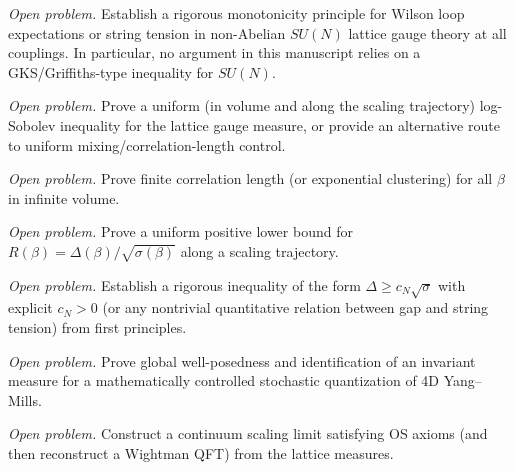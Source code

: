 \begin{theorem}
\label{thm:nonabelian_monotonicity_supp}
\emph{Open problem.} Establish a rigorous monotonicity principle for Wilson loop expectations or string tension in non-Abelian $SU(N)$ lattice gauge theory at all couplings.
In particular, no argument in this manuscript relies on a GKS/Griffiths-type inequality for $SU(N)$.
\end{theorem}

\begin{theorem}
\label{thm:uniform-lsi-induction}
\emph{Open problem.} Prove a uniform (in volume and along the scaling trajectory) log-Sobolev inequality for the lattice gauge measure, or provide an alternative route to uniform mixing/correlation-length control.
\end{theorem}

\begin{theorem}
\label{thm:cluster}
\emph{Open problem.} Prove finite correlation length (or exponential clustering) for all $\beta$ in infinite volume.
\end{theorem}

\begin{theorem}
\label{thm:ratio-bound}
\emph{Open problem.} Prove a uniform positive lower bound for $R(\beta)=\Delta(\beta)/\sqrt{\sigma(\beta)}$ along a scaling trajectory.
\end{theorem}

\begin{theorem}
\label{thm:giles-teper_supp}
\emph{Open problem.} Establish a rigorous inequality of the form $\Delta\ge c_N\sqrt{\sigma}$ with explicit $c_N>0$ (or any nontrivial quantitative relation between gap and string tension) from first principles.
\end{theorem}

\begin{theorem}
\label{thm:spde-wellposed}
\emph{Open problem.} Prove global well-posedness and identification of an invariant measure for a mathematically controlled stochastic quantization of 4D Yang--Mills.
\end{theorem}

\begin{theorem}
\label{thm:full-os}
\emph{Open problem.} Construct a continuum scaling limit satisfying OS axioms (and then reconstruct a Wightman QFT) from the lattice measures.
\end{theorem}

